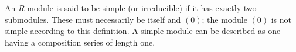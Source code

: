 An $R$-module is said to be simple (or irreducible) if it has exactly two submodules. These must necessarily be itself and $(0)$; the module $(0)$ is not simple according to this definition. A simple module can be described as one having a composition series of length one.
